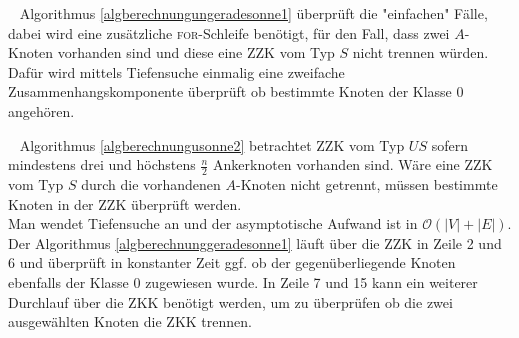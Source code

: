 \vspace{-2mm}
~\linebreak 
Algorithmus \ref{algberechnungungeradesonne1} überprüft die "einfachen" Fälle, dabei wird eine zusätzliche \textsc{for}-Schleife benötigt, für den Fall, dass zwei $A$-Knoten vorhanden sind und diese eine ZZK vom Typ $S$ nicht trennen würden. Dafür wird mittels Tiefensuche einmalig eine zweifache Zusammenhangskomponente überprüft ob bestimmte Knoten der Klasse $0$ angehören.\\
\vspace{-4mm}
\begin{algorithm}
\caption{$US(x)$}
\begin{algorithmic}[1]
\ENDIF
\end{algorithmic}
\label{algberechnungusonne2}
\end{algorithm}
\vspace{-4mm}
~\linebreak
Algorithmus \ref{algberechnungusonne2} betrachtet ZZK vom Typ $US$ sofern mindestens drei und höchstens $\frac{n}{2}$ Ankerknoten vorhanden sind. Wäre eine ZZK vom Typ $S$ durch die vorhandenen $A$-Knoten nicht getrennt, müssen bestimmte Knoten in der ZZK überprüft werden.\\
Man wendet Tiefensuche an und der asymptotische Aufwand ist in $\mathcal{O}(|V|+|E|)$.\newpage
Der Algorithmus \ref{algberechnunggeradesonne1} läuft über die ZZK in Zeile 2 und 6 und überprüft in konstanter Zeit ggf. ob der gegenüberliegende Knoten ebenfalls der Klasse $0$ zugewiesen wurde. In Zeile 7 und 15 kann ein weiterer Durchlauf über die ZKK benötigt werden, um zu überprüfen ob die zwei ausgewählten Knoten die ZKK trennen.\newline
\vspace{-5mm}
